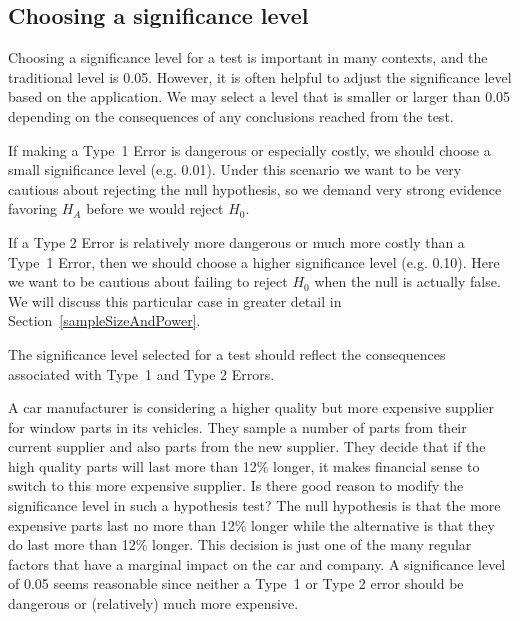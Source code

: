 \subsection{Choosing a significance level}
\label{significanceLevel}


Choosing a significance level for a test is important in many contexts, and the traditional level is 0.05. However, it is often helpful to adjust the significance level based on the application. We may select a level that is smaller or larger than 0.05 depending on the consequences of any conclusions reached from the test.

If making a Type~1 Error is dangerous or especially costly, we should choose a small significance level (e.g. 0.01). Under this scenario we want to be very cautious about rejecting the null hypothesis, so we demand very strong evidence favoring $H_A$ before we would reject $H_0$.

If a Type 2 Error is relatively more dangerous or much more costly than a Type~1 Error, then we should choose a higher significance level (e.g. 0.10). Here we want to be cautious about failing to reject $H_0$ when the null is actually false.  We will discuss this particular case in greater detail in Section~\ref{sampleSizeAndPower}.

\begin{tipBox}{
The significance level selected for a test should reflect the consequences associated with Type~1 and Type 2 Errors.}
\end{tipBox}

\begin{example}{A car manufacturer is considering a higher quality but more expensive supplier for window parts in its vehicles. They sample a number of parts from their current supplier and also parts from the new supplier. They decide that if the high quality parts will last more than 12\% longer, it makes financial sense to switch to this more expensive supplier. Is there good reason to modify the significance level in such a hypothesis test?}
The null hypothesis is that the more expensive parts last no more than 12\% longer while the alternative is that they do last more than 12\% longer. This decision is just one of the many regular factors that have a marginal impact on the car and company. A significance level of 0.05 seems reasonable since neither a Type~1 or Type 2 error should be dangerous or (relatively) much more expensive.
\end{example}

